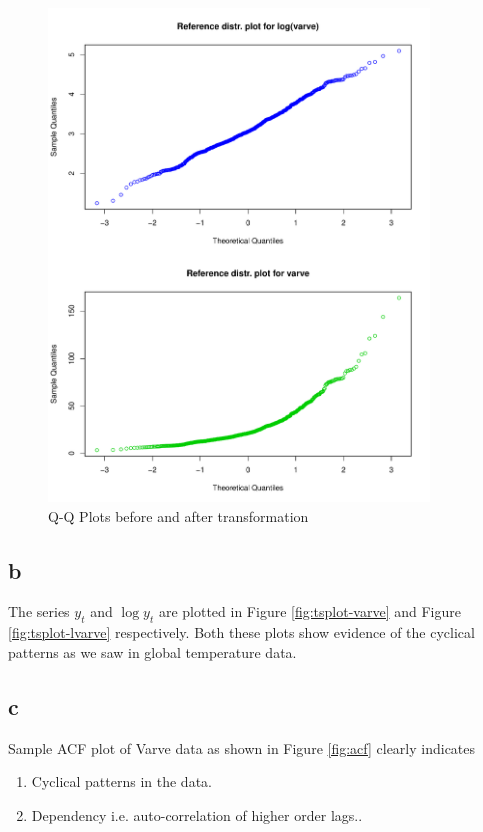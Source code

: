 \documentclass{article}
\begin{document}
\begin{figure}
	\centering
	\includegraphics[width=0.9\textwidth]{QQPlot}
	\caption{Q-Q Plots before and after transformation }
	\label{fig:QQPlot}
\end{figure}

\subsection{b}

The series $y_t$ and $\log{y_t}$ are plotted in Figure \ref{fig:tsplot-varve} and Figure \ref{fig:tsplot-lvarve} respectively. 
Both these plots show evidence of the cyclical patterns as we saw in global temperature data. 

\subsection{c}

Sample ACF plot of Varve data as shown in Figure \ref{fig:acf} clearly indicates 
\begin{enumerate}
	\item  Cyclical patterns in the data.
	\item  Dependency i.e. auto-correlation of higher order lags.. 
 
\end{enumerate}
\end{document}

